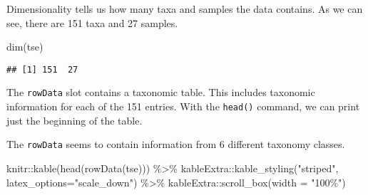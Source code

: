 \documentclass[
  oneside]{book}
\newenvironment{Shaded}{\begin{snugshade}}{\end{snugshade}}
\newcommand{\AttributeTok}[1]{\textcolor[rgb]{0.77,0.63,0.00}{#1}}
\newcommand{\FunctionTok}[1]{\textcolor[rgb]{0.00,0.00,0.00}{#1}}
\newcommand{\NormalTok}[1]{#1}
\newcommand{\SpecialCharTok}[1]{\textcolor[rgb]{0.00,0.00,0.00}{#1}}
\newcommand{\StringTok}[1]{\textcolor[rgb]{0.31,0.60,0.02}{#1}}
\begin{document}
Dimensionality tells us how many taxa and samples the data
contains. As we can see, there are 151 taxa and 27
samples.

\begin{Shaded}
\begin{Highlighting}[]
\FunctionTok{dim}\NormalTok{(tse)}
\end{Highlighting}
\end{Shaded}

\begin{verbatim}
## [1] 151  27
\end{verbatim}

The \texttt{rowData} slot contains a taxonomic table. This includes taxonomic
information for each of the 151 entries. With the \texttt{head()}
command, we can print just the beginning of the table.

The \texttt{rowData} seems to contain information from 6
different taxonomy classes.

\begin{Shaded}
\begin{Highlighting}[]
\NormalTok{knitr}\SpecialCharTok{::}\FunctionTok{kable}\NormalTok{(}\FunctionTok{head}\NormalTok{(}\FunctionTok{rowData}\NormalTok{(tse))) }\SpecialCharTok{\%\textgreater{}\%} 
\NormalTok{  kableExtra}\SpecialCharTok{::}\FunctionTok{kable\_styling}\NormalTok{(}\StringTok{"striped"}\NormalTok{, }
                            \AttributeTok{latex\_options=}\StringTok{"scale\_down"}\NormalTok{) }\SpecialCharTok{\%\textgreater{}\%} 
\NormalTok{  kableExtra}\SpecialCharTok{::}\FunctionTok{scroll\_box}\NormalTok{(}\AttributeTok{width =} \StringTok{"100\%"}\NormalTok{)}
\end{Highlighting}
\end{Shaded}

\begin{table}
\centering
{}
\end{table}
\end{document}
